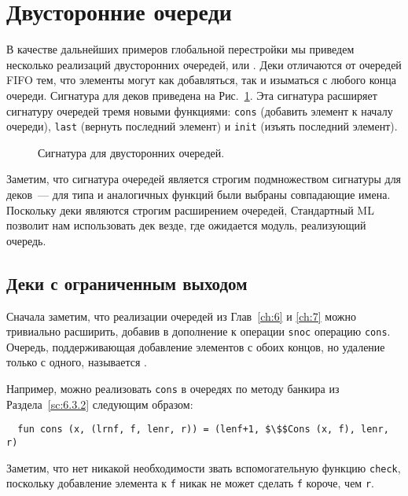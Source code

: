 \section{Двусторонние очереди}
\label{sc:8.4}

В качестве дальнейших примеров глобальной перестройки мы приведем
несколько реализаций двусторонних очередей, или
. Деки отличаются от очередей FIFO тем, что
элементы могут как добавляться, так и изыматься с любого конца
очереди. Сигнатура для деков приведена на Рис.~\ref{fig:8.2}. Эта
сигнатура расширяет сигнатуру очередей тремя новыми функциями:
\lstinline!cons! (добавить элемент к началу очереди), \lstinline!last!
(вернуть последний элемент) и \lstinline!init! (изъять последний
элемент).

\begin{figure}
  \centering

  \caption{Сигнатура для двусторонних очередей.}
  \label{fig:8.2}
\end{figure}

\begin{remark}
  Заметим, что сигнатура очередей является строгим подмножеством
  сигнатуры для деков~--- для типа и аналогичных функций были выбраны
  совпадающие имена. Поскольку деки являются строгим расширением
  очередей, Стандартный ML позволит нам использовать дек везде, где
  ожидается модуль, реализующий очередь.
\end{remark}

\subsection{Деки с ограниченным выходом}
\label{sc:8.4.1}

Сначала заметим, что реализации очередей из Глав~\ref{ch:6} и
\ref{ch:7} можно тривиально расширить, добавив в дополнение к операции
\lstinline!snoc! операцию \lstinline!cons!. Очередь, поддерживающая
добавление элементов с обоих концов, но удаление только с одного,
называется .

Например, можно реализовать \lstinline!cons! в очередях по методу
банкира из Раздела~\ref{sc:6.3.2} следующим образом:
\begin{lstlisting}
  fun cons (x, (lrnf, f, lenr, r)) = (lenf+1, $\$$Cons (x, f), lenr, r)
\end{lstlisting}
Заметим, что нет никакой необходимости звать вспомогательную функцию
\lstinline!check!, поскольку добавление элемента к \lstinline!f! никак
не может сделать \lstinline!f! короче, чем \lstinline!r!.


